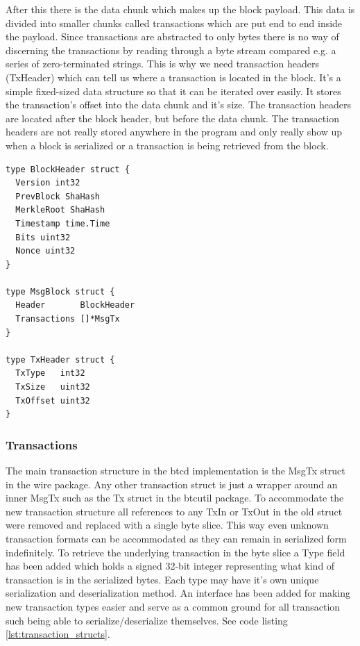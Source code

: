 \documentclass[11pt]{article}
\begin{document}
After this there is the data chunk which makes up the block payload. This data is divided into smaller chunks called transactions which are put end to end inside the payload. Since transactions are abstracted to only bytes there is no way of discerning the transactions by reading through a byte stream compared e.g. a series of zero-terminated strings. This is why we need transaction headers (TxHeader) which can tell us where a transaction is located in the block. It's a simple fixed-sized data structure so that it can be iterated over easily. It stores the transaction's offset into the data chunk and it's size. The transaction headers are located after the block header, but before the data chunk. The transaction headers are not really stored anywhere in the program and only really show up when a block is serialized or a transaction is being retrieved from the block.

\begin{lstlisting}[float=h!,caption={Block Structure},label=lst:block_structs]
type BlockHeader struct {
  Version int32
  PrevBlock ShaHash
  MerkleRoot ShaHash
  Timestamp time.Time
  Bits uint32
  Nonce uint32
}

type MsgBlock struct {
  Header       BlockHeader
  Transactions []*MsgTx
}

type TxHeader struct {
  TxType   int32
  TxSize   uint32
  TxOffset uint32
}
\end{lstlisting}

\subsubsection{Transactions}
The main transaction structure in the btcd implementation is the MsgTx struct in the wire package. Any other transaction struct is just a wrapper around an inner MsgTx such as the Tx struct in the btcutil package. To accommodate the new transaction structure all references to any TxIn or 
TxOut in the old struct were removed and replaced with a single byte slice. This way even unknown transaction formats can be accommodated as they can remain in serialized form indefinitely. To retrieve the underlying transaction in the byte slice a Type field has been added which holds a signed 32-bit integer representing what kind of transaction is in the serialized bytes. Each type may have it's own unique serialization and deserialization method. An interface has been added for making new transaction types easier and serve as a common ground for all transaction such being able to serialize/deserialize themselves. See code listing \ref{lst:transaction_structs}.
\end{document}
